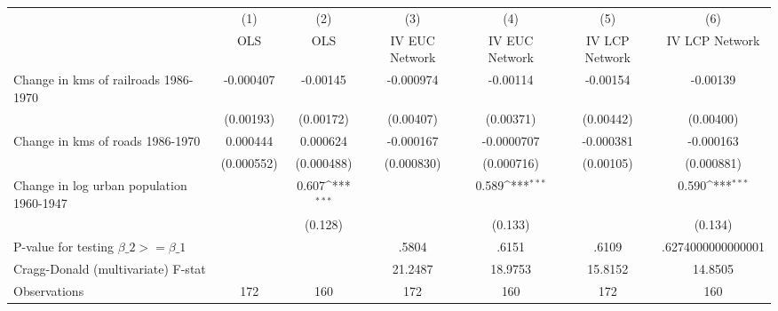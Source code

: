 {
\def\sym#1{\ifmmode^{#1}\else\(^{#1}\)\fi}
\begin{tabular}{l*{6}{c}}
\hline\hline
                &\multicolumn{1}{c}{(1)}&\multicolumn{1}{c}{(2)}&\multicolumn{1}{c}{(3)}&\multicolumn{1}{c}{(4)}&\multicolumn{1}{c}{(5)}&\multicolumn{1}{c}{(6)}\\
                &\multicolumn{1}{c}{OLS}&\multicolumn{1}{c}{OLS}&\multicolumn{1}{c}{IV EUC Network}&\multicolumn{1}{c}{IV EUC Network}&\multicolumn{1}{c}{IV LCP Network}&\multicolumn{1}{c}{IV LCP Network}\\
\hline
Change in kms of railroads 1986-1970&-0.000407         & -0.00145         &-0.000974         & -0.00114         & -0.00154         & -0.00139         \\
                &(0.00193)         &(0.00172)         &(0.00407)         &(0.00371)         &(0.00442)         &(0.00400)         \\
[1em]
Change in kms of roads 1986-1970& 0.000444         & 0.000624         &-0.000167         &-0.0000707         &-0.000381         &-0.000163         \\
                &(0.000552)         &(0.000488)         &(0.000830)         &(0.000716)         &(0.00105)         &(0.000881)         \\
[1em]
Change in log urban population 1960-1947&                  &    0.607\sym{***}&                  &    0.589\sym{***}&                  &    0.590\sym{***}\\
                &                  &  (0.128)         &                  &  (0.133)         &                  &  (0.134)         \\
\hline
P-value for testing $\beta\_{2} >= \beta\_{1}$&                  &                  &    .5804         &    .6151         &    .6109         &.6274000000000001         \\
Cragg-Donald (multivariate) F-stat&                  &                  &  21.2487         &  18.9753         &  15.8152         &  14.8505         \\
Observations    &      172         &      160         &      172         &      160         &      172         &      160         \\
\hline\hline
\end{tabular}
}
